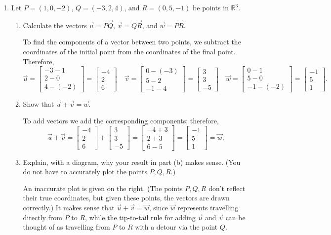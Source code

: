 \documentclass[12pt]{article}
\newcommand{\R}{\mathbb{R}}
\newcommand{\bbm}{\begin{bmatrix}}
\newcommand{\ebm}{\end{bmatrix}}
\begin{document}
\thispagestyle{fancy}
 \begin{enumerate}
 \item  Let $P=(1,0,-2)$, $Q=(-3,2,4)$, and $R=(0,5,-1)$ be points in $\R^3$.
\begin{enumerate}
 \item Calculate the vectors $\vec{u}=\overrightarrow{PQ}$, $\vec{v}=\overrightarrow{QR}$, and $\vec{w}=\overrightarrow{PR}$.

\bigskip

To find the components of a vector between two points, we subtract the coordinates of the initial point from the coordinates of the final point. Therefore,
\[
 \vec{u} = \bbm -3-1\\2-0\\4-(-2)\ebm = \bbm -4\\2\\6\ebm \quad \vec{v} = \bbm 0-(-3)\\5-2\\-1-4\ebm = \bbm 3\\3\\-5\ebm \quad \vec{w} = \bbm 0-1\\5-0\\-1-(-2)\ebm = \bbm -1\\5\\1\ebm.
\]


 \item Show that $\vec{u}+\vec{v} = \vec{w}$.

\bigskip

To add vectors we add the corresponding components; therefore,
\[
 \vec{u}+\vec{v} = \bbm -4\\2\\6\ebm+\bbm 3\\3\\-5\ebm = \bbm -4+3\\2+3\\6-5\ebm = \bbm -1\\5\\1\ebm = \vec{w}.
\]


 \item Explain, with a diagram, why your result in part (b) makes sense. (You do not have to accurately plot the points $P,Q,R$.)

\begin{multicols}{2}
 An inaccurate plot is given on the right. (The points $P,Q,R$ don't reflect their true coordinates, but given these points, the vectors are drawn correctly.) It makes sense that $\vec{u}+\vec{v}=\vec{w}$, since $\vec{w}$ represents travelling directly from $P$ to $R$, while the tip-to-tail rule for adding $\vec{u}$ and $\vec{v}$ can be thought of as travelling from $P$ to $R$ with a detour via the point $Q$.


\end{multicols}
\end{enumerate}
\end{enumerate}
\end{document}
